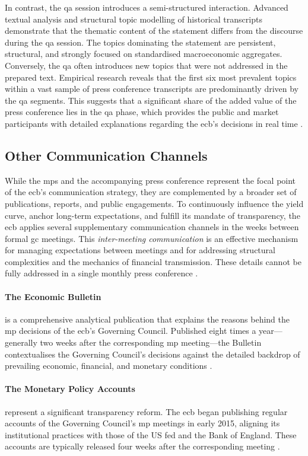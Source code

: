 In contrast, the \gls{qa} session introduces a semi-structured interaction. Advanced textual analysis and structural topic modelling of historical transcripts demonstrate that the thematic content of the statement differs from the discourse during the \gls{qa} session. The topics dominating the statement are persistent, structural, and strongly focused on standardised macroeconomic aggregates. Conversely, the \gls{qa} often introduces new topics that were not addressed in the prepared text. Empirical research reveals that the first six most prevalent topics within a vast sample of press conference transcripts are predominantly driven by the \gls{qa} segments. This suggests that a significant share of the added value of the press conference lies in the \gls{qa} phase, which provides the public and market participants with detailed explanations regarding the \gls{ecb}'s decisions in real time \cite{ECB_WP2742}.

\subsection{Other Communication Channels}
While the \gls{mps} and the accompanying press conference represent the focal point of the \gls{ecb}'s communication strategy, they are complemented by a broader set of publications, reports, and public engagements. To continuously influence the yield curve, anchor long-term expectations, and fulfill its mandate of transparency, the \gls{ecb} applies several supplementary communication channels in the weeks between formal \gls{gc} meetings. This \emph{inter-meeting communication} is an effective mechanism for managing expectations between meetings and for addressing structural complexities and the mechanics of financial transmission. These details cannot be fully addressed in a single monthly press conference \cite{Istrefi2021ECB}.

\paragraph{The Economic Bulletin} is a comprehensive analytical publication that explains the reasons behind the \gls{mp} decisions of the \gls{ecb}'s Governing Council. Published eight times a year---generally two weeks after the corresponding \gls{mp} meeting---the Bulletin contextualises the Governing Council's decisions against the detailed backdrop of prevailing economic, financial, and monetary conditions \cite{press_to_speeches}.

\paragraph{The Monetary Policy Accounts} represent a significant transparency reform. The \gls{ecb} began publishing regular accounts of the Governing Council's \gls{mp} meetings in early 2015, aligning its institutional practices with those of the US \gls{fed} and the Bank of England. These accounts are typically released four weeks after the corresponding meeting \cite{MP_accounts}.

